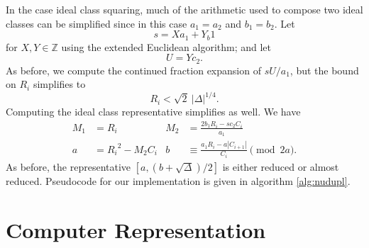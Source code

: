 \documentclass{ucalgthes1}
\theoremstyle{plain}
\theoremstyle{definition}
\newtheorem{defn}[thm]{Definition}
\newcommand{\OO}{\mathcal{O}}
\newcommand{\ZZ}{\mathbb{Z}}
\begin{document}
In the case ideal class squaring, much of the arithmetic used to compose two ideal classes can be simplified since in this case $a_1=a_2$ and $b_1=b_2$.  Let 
\[
	s = Xa_1 + Y_b1
\]
for $X,Y \in \ZZ$ using the extended Euclidean algorithm; and let 
\[
	U = Yc_2.
\]
As before, we compute the continued fraction expansion of $sU/a_1$, but the bound on $R_i$ simplifies to
\[
	R_i < \sqrt 2 ~ |\Delta|^{1/4}.
\]
Computing the ideal class representative simplifies as well.  We have
\begin{align*}
	M_1 &= R_i & 
	M_2 &= \frac{2b_1R_i - sc_2C_i}{a_1} \\
	a &= {R_i}^2 - M_2C_i &
	b &\equiv \frac{a_1 R_i - a |C_{i+1}|}{C_i} \pmod{2a}.
\end{align*}
As before, the representative $[a, (b+\sqrt\Delta)/2]$ is either reduced or almost reduced.  \break Pseudocode for our implementation is given in algorithm \ref{alg:nudupl}.


\begin{comment}
\bigbreak
\section{To use still}



\begin{defn}
A \emph{prime ideal} of $\OO$ is an invertible $\OO$-ideal $\mathfrak{p} \neq \OO$ with the property that if $\mathfrak{p} | \mathfrak{a}\mathfrak{b}$, for $\OO$-ideals $\mathfrak{a}$ and $\mathfrak{b}$, then $\mathfrak{p} | \mathfrak{a}$ or $\mathfrak{p} | \mathfrak{b}$ \cite{JacobsonCh4}[p.~93].
\end{defn}
In the ideal class group, the reduced form of a prime ideal $\mathfrak{p}$ is given by $[p, \beta]$ where $p \in \ZZ$ is prime.
\end{comment}


\bigbreak
\section{Computer Representation}
\label{section:computerRepresentation}
\end{document}
